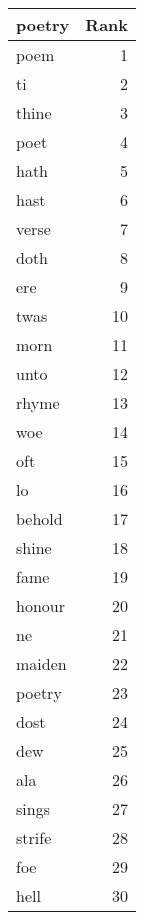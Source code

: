 \begin{table}
\label{tab:poetry_terms}
\begin{tabular}{lr}
\toprule
poetry & Rank \\
\midrule
poem & 1 \\
ti & 2 \\
thine & 3 \\
poet & 4 \\
hath & 5 \\
hast & 6 \\
verse & 7 \\
doth & 8 \\
ere & 9 \\
twas & 10 \\
morn & 11 \\
unto & 12 \\
rhyme & 13 \\
woe & 14 \\
oft & 15 \\
lo & 16 \\
behold & 17 \\
shine & 18 \\
fame & 19 \\
honour & 20 \\
ne & 21 \\
maiden & 22 \\
poetry & 23 \\
dost & 24 \\
dew & 25 \\
ala & 26 \\
sings & 27 \\
strife & 28 \\
foe & 29 \\
hell & 30 \\
\bottomrule
\end{tabular}
\end{table}
